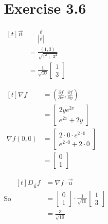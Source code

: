 \documentclass[11pt,fleqn]{book} %
\begin{document}
\section*{Exercise 3.6}

\begin{minipage}[t]{0.3\linewidth}
    $\begin{aligned}[t]
        \vec{u} & = \frac{\vec{v}}{| \vec{v} |}                             \\
                & = \frac{(1, 3)}{\sqrt{1^2 + 3^2}}                         \\
                & = \frac{1}{\sqrt{10}}\begin{bmatrix} 1 \\ 3 \end{bmatrix}
    \end{aligned}$
\end{minipage}
\begin{minipage}[t]{0.3\linewidth}
    $\begin{aligned}[t]
        \nabla f 
        & = \left( \frac{\partial f}{\partial x}, \frac{\partial f}{\partial y} \right) \\
        & = \begin{bmatrix} 2ye^{2x} \\ e^{2x} + 2y \end{bmatrix} \\
        \nabla f(0, 0) 
        & = \begin{bmatrix}
            2 \cdot 0 \cdot e^{2 \cdot 0} \\
            e^{2 \cdot 0} + 2 \cdot 0
        \end{bmatrix} \\
        &= \begin{bmatrix} 0 \\ 1 \end{bmatrix}
    \end{aligned}$

\end{minipage}
\begin{minipage}[t]{0.3\linewidth}
    So $\begin{aligned}[t]
        D_{\vec{u}} f 
        & = \nabla f \cdot \vec{u} \\
        & = \begin{bmatrix} 0 \\ 1 \end{bmatrix} \cdot \frac{1}{\sqrt{10}} \begin{bmatrix} 1 \\ 3 \end{bmatrix} \\
        & = \frac{3}{\sqrt{10}}
    \end{aligned}$
\end{minipage}
\end{document}
